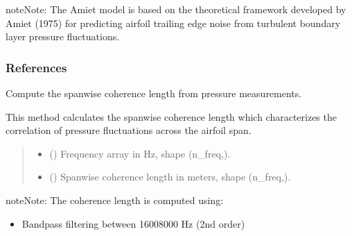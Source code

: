 \documentclass[letterpaper,10pt,english]{sphinxmanual}
\begin{document}
\begin{fulllineitems}
\begin{fulllineitems}
\begin{quote}
\begin{description}
\end{description}\end{quote}

\end{fulllineitems}


\begin{sphinxadmonition}{note}{Note:}
\sphinxAtStartPar
The Amiet model is based on the theoretical framework developed by
Amiet (1975) for predicting airfoil trailing edge noise from
turbulent boundary layer pressure fluctuations.
\end{sphinxadmonition}
\subsubsection*{References}

\begin{fulllineitems}
\label{\detokenize{amiet_model:amiet_self_noise.amiet_model.AmietModel.compute_coherence}}
\pysigstartsignatures
\pysiglinewithargsret
{}
{}
{}
\pysigstopsignatures
\sphinxAtStartPar
Compute the spanwise coherence length from pressure measurements.

\sphinxAtStartPar
This method calculates the spanwise coherence length which
characterizes the correlation of pressure fluctuations across
the airfoil span.
\begin{quote}\begin{description}
\sphinxAtStartPar
\begin{itemize}
\item {} 
\sphinxAtStartPar
{} () \textendash{} Frequency array in Hz, shape (n\_freq,).

\item {} 
\sphinxAtStartPar
{} () \textendash{} Spanwise coherence length in meters, shape (n\_freq,).

\end{itemize}


\end{description}\end{quote}

\begin{sphinxadmonition}{note}{Note:}
\sphinxAtStartPar
The coherence length is computed using:
\begin{itemize}
\item {} 
\sphinxAtStartPar
Bandpass filtering between 1600\sphinxhyphen{}8000 Hz (2nd order)


\end{itemize}
\end{sphinxadmonition}
\end{fulllineitems}
\end{fulllineitems}
\end{document}

